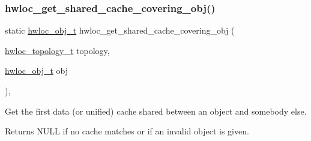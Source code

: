 \subsubsection{\texorpdfstring{hwloc\+\_\+get\+\_\+shared\+\_\+cache\+\_\+covering\+\_\+obj()}{hwloc\_get\_shared\_cache\_covering\_obj()}}
{\footnotesize\ttfamily static \hyperlink{a00185_ga79b8ab56877ef99ac59b833203391c7d}{hwloc\+\_\+obj\+\_\+t} hwloc\+\_\+get\+\_\+shared\+\_\+cache\+\_\+covering\+\_\+obj (\begin{DoxyParamCaption}\item[{\hyperlink{a00186_ga9d1e76ee15a7dee158b786c30b6a6e38}{hwloc\+\_\+topology\+\_\+t}}]{topology,  }\item[{\hyperlink{a00185_ga79b8ab56877ef99ac59b833203391c7d}{hwloc\+\_\+obj\+\_\+t}}]{obj }\end{DoxyParamCaption})\hspace{0.3cm}{\ttfamily [inline]}, {\ttfamily [static]}}



Get the first data (or unified) cache shared between an object and somebody else. 

\begin{DoxyReturn}{Returns}
{\ttfamily N\+U\+LL} if no cache matches or if an invalid object is given. 
\end{DoxyReturn}
